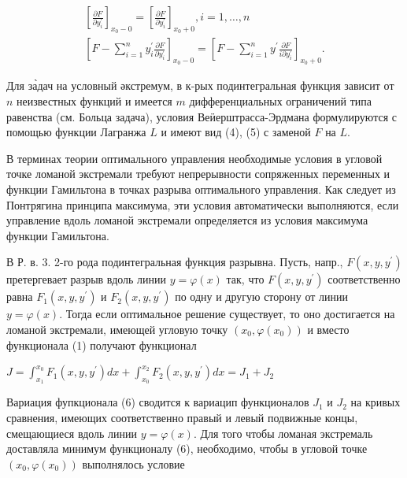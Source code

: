 \documentclass[10pt]{article}
\begin{document}
\[

\begin{gathered}

{\left[\frac{\partial F}{\partial y_{i}^{\prime}}\right]_{x_{0}-0}=\left[\frac{\partial F}{\partial y_{i}^{\prime}}\right]_{x_{0}+0}, i=1, \ldots, n} \\

{\left[F-\sum_{i=1}^{n} y_{i}^{\prime} \frac{\partial F}{\partial y_{i}^{\prime}}\right]_{x_{0}-0}=\left[F-\sum_{i=1}^{n} y^{\prime} \frac{\partial F}{i \partial y_{i}^{\prime}}\right]_{x_{0}+0} .}

\end{gathered}

\]



Для за̀дач на условный әкстремум, в к-рых подинтегральная функция зависит от $n$ неизвестных функций и имеется $m$ дифференциальных ограничений типа равенства (см. Больца задача), условия Веӥерштрасса-Эрдмана формулируются с помощью функции Лагранжа $L$ и имеют вид (4), (5) с заменой $F$ на $L$.



В терминах теории оптимального управления необходимые условия в угловой точке ломаной экстремали требуют непрерывности сопряженных переменных и функции Гамильтона в точках разрыва оптимального управления. Как следует из Понтрягина принципа максимума, эти условия автоматически выполняются, если управление вдоль ломаной экстремали определяется из условия максимума функции Гамильтона.



В Р. в. 3. 2-го рода подинтегральная функция разрывна. Пусть, напр., $F\left(x, y, y^{\prime}\right)$ претергевает разрыв вдоль линии $y=\varphi(x)$ так, что $F\left(x, y, y^{\prime}\right)$ соответственно равна $F_{1}\left(x, y, y^{\prime}\right)$ и $F_{2}\left(x, y, y^{\prime}\right)$ по одну и другую сторону от линии $y=\varphi(x)$. Тогда если оптимальное решение существует, то оно достигается на ломаной экстремали, имеющей угловую точку $\left(x_{0}, \varphi\left(x_{0}\right)\right)$ и вместо функционала (1) получают функционал



$J=\int_{x_{1}}^{x_{0}} F_{1}\left(x, y, y^{\prime}\right) d x+\int_{x_{0}}^{x_{2}} F_{2}\left(x, y, y^{\prime}\right) d x=J_{1}+J_{2}$



Вариация фупкционала (6) сводится к вариацип функционалов $J_{1}$ и $J_{2}$ на кривых сравнения, имеющих соответственно правый и левый подвижные концы, смещающиеся вдоль линии $y=\varphi(x)$. Для того чтобы ломаная экстремаль доставляла минимум функционалу (6), необходимо, чтобы в угловой точке $\left(x_{0}, \varphi\left(x_{0}\right)\right)$ выполнялось условие
\end{document}
